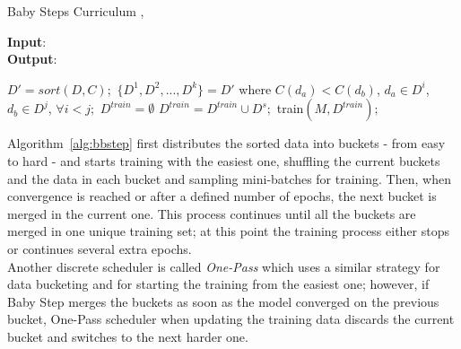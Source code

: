 \begin{algorithm}
    \caption{Baby Steps Curriculum \cite{cirik2016visualizing}, \cite{wang2021survey}}\label{alg:bbstep}
    \hspace*{\algorithmicindent} \textbf{Input}: \\
    \hspace*{\algorithmicindent} \textbf{Output}: 
    \begin{algorithmic}[1]
    \State $D'= sort(D,C);$
    \State $\lbrace D^1, D^2,...,D^k \rbrace = D'$ where $C(d_a) < C(d_b)$, $d_a\in D^i$, $d_b\in D^j$, $\forall i<j;$
    \State $D^{train} = \emptyset$
        \State $D^{train} = D^{train} \cup D^s;$
        \State train$(M, D^{train});$
        \EndWhile
    \EndFor
    \end{algorithmic}
\end{algorithm}
Algorithm~\ref{alg:bbstep} first distributes the sorted data into buckets - from easy to hard - and starts training with the easiest one, 
shuffling the current buckets and the data in each bucket and sampling mini-batches for training.
Then, when convergence is reached or after a defined number of epochs, the next bucket is merged in the current one. 
This process continues until all the buckets are merged in one unique training set; at this point the training process either stops or continues 
several extra epochs. \\
Another discrete scheduler is called \textit{One-Pass} which uses a similar strategy for data bucketing and for starting the training from the easiest one;
however, if Baby Step merges the buckets as soon as the model converged on the previous bucket, One-Pass scheduler when updating the training data discards the current bucket
and switches to the next harder one. 

